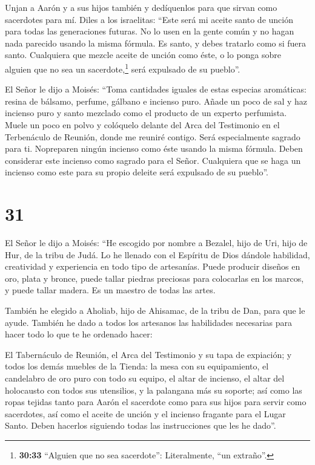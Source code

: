  Unjan a Aarón y a sus hijos también y dedíquenlos para que
sirvan como sacerdotes para mí.  Diles a los israelitas:
``Este será mi aceite santo de unción para todas las generaciones
futuras.  No lo usen en la gente común y no hagan nada
parecido usando la misma fórmula. Es santo, y debes tratarlo como si
fuera santo.  Cualquiera que mezcle aceite de unción como
éste, o lo ponga sobre alguien que no sea un sacerdote,\footnote{\textbf{30:33}
  ``Alguien que no sea sacerdote'': Literalmente, ``un extraño''.} será
expulsado de su pueblo''.

 El Señor le dijo a Moisés: ``Toma cantidades iguales de
estas especias aromáticas: resina de bálsamo, perfume, gálbano e
incienso puro.  Añade un poco de sal y haz incienso puro y
santo mezclado como el producto de un experto perfumista. 
Muele un poco en polvo y colóquelo delante del Arca del Testimonio en el
Terbenáculo de Reunión, donde me reuniré contigo. Será especialmente
sagrado para ti.  Nopreparen ningún incienso como éste
usando la misma fórmula. Deben considerar este incienso como sagrado
para el Señor.  Cualquiera que se haga un incienso como
este para su propio deleite será expulsado de su pueblo''.

\hypertarget{section-30}{%
\section{31}\label{section-30}}

 El Señor le dijo a Moisés:  ``He escogido por
nombre a Bezalel, hijo de Uri, hijo de Hur, de la tribu de Judá.
 Lo he llenado con el Espíritu de Dios dándole habilidad,
creatividad y experiencia en todo tipo de artesanías.  Puede
producir diseños en oro, plata y bronce,  puede tallar
piedras preciosas para colocarlas en los marcos, y puede tallar madera.
Es un maestro de todas las artes.

 También he elegido a Aholiab, hijo de Ahisamac, de la tribu
de Dan, para que le ayude. También he dado a todos los artesanos las
habilidades necesarias para hacer todo lo que te he ordenado hacer:

 El Tabernáculo de Reunión, el Arca del Testimonio y su tapa
de expiación; y todos los demás muebles de la Tienda:  la
mesa con su equipamiento, el candelabro de oro puro con todo su equipo,
el altar de incienso,  el altar del holocausto con todos sus
utensilios, y la palangana más su soporte;  así como las
ropas tejidas tanto para Aarón el sacerdote como para sus hijos para
servir como sacerdotes,  así como el aceite de unción y el
incienso fragante para el Lugar Santo. Deben hacerlos siguiendo todas
las instrucciones que les he dado''.

